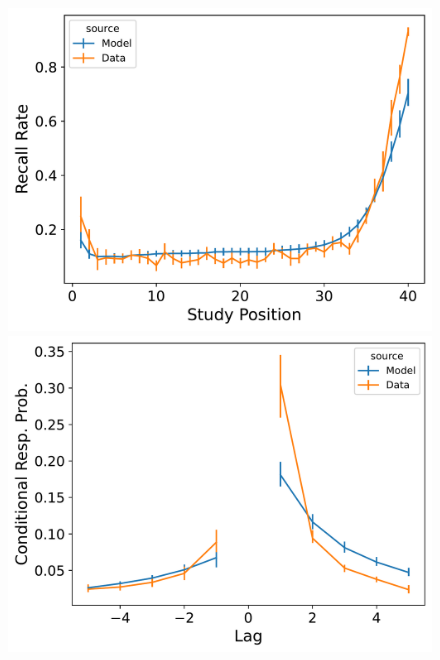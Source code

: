 \documentclass[
  letterpaper,
  11pt,
  english,
  singlespacing,
  headsepline]{MastersDoctoralThesis}
\begin{document}
\begin{figure}
\begin{minipage}{0.33\linewidth}
\includegraphics{icmr_figures/Murdock1962_TraceScalingCMR_Model_Fitting_LL40_spc-1.png}\end{minipage}%
\newline
\begin{minipage}{0.33\linewidth}
\includegraphics{icmr_figures/Murdock1962_MultiScalingCMR_Model_Fitting_LL40_crp-1.png}\end{minipage}%
%
\begin{minipage}{0.33\linewidth}

\end{minipage}
\end{figure}
\end{document}
